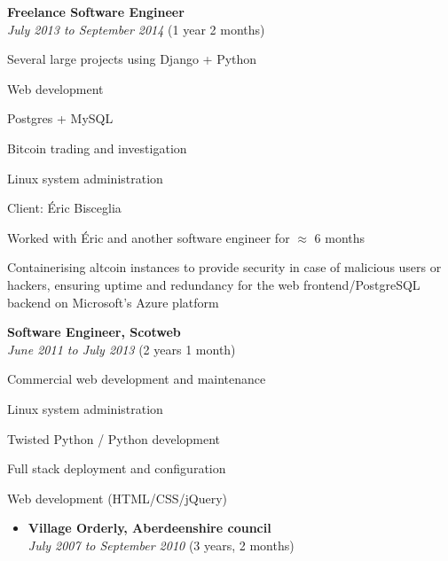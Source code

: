 \documentclass[12pt]{article}
\newenvironment{outerlist}[1][\enskip\textbullet]%
	{\begin{itemize}[#1]}{\end{itemize}%
		\vspace{-.6\baselineskip}}
\newenvironment{innerlist}[1][\enskip\textbullet]%
	{\begin{compactitem}[#1]}{\end{compactitem}}
\newcommand{\halfblankline}{\quad\vspace{-0.5\baselineskip}\pagebreak[3]}
\begin{document}
		\vspace{-2mm}
		\begin{outerlist}
			\item[] \textbf{Freelance Software Engineer} \\
			\textit{July 2013 to September 2014} (1 year 2 months)
			\begin{innerlist}
				\item Several large projects using Django + Python
				\item Web development
				\item Postgres + MySQL
				\item Bitcoin trading and investigation
				\item Linux system administration
			\end{innerlist}
			\item[] Client: Éric Bisceglia
			\begin{innerlist}
				\item Worked with Éric and another software engineer for $\approx$ 6 months
				\item Containerising altcoin instances to provide security in case of malicious users or hackers, ensuring uptime and redundancy for the web frontend/PostgreSQL backend on Microsoft's Azure platform
			\end{innerlist}
		\end{outerlist}
		
		\halfblankline
		
		\vspace{-2mm}
		\begin{outerlist}
			\item[] \textbf{Software Engineer, Scotweb} \\
			\textit{June 2011 to July 2013} (2 years 1 month)
			\begin{innerlist}
				\item Commercial web development and maintenance
				\item Linux system administration
				\item Twisted Python / Python development
				\item Full stack deployment and configuration
				\item Web development (HTML/CSS/jQuery)
			\end{innerlist}
		\end{outerlist}
		
		\vspace{-2mm}
		\begin{outerlist}
			\item[] \textbf{Village Orderly, Aberdeenshire council} \\
			\textit{July 2007 to September 2010} (3 years, 2 months)
		\end{outerlist}
		
\end{document}
